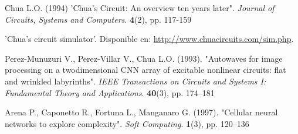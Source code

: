 \documentclass[11pt,letterpaper]{article}
\begin{document}
\begin{multicols*}{2}
\begin{thebibliography}{9}
 Chua L.O. (1994) 'Chua's Circuit: An overview ten years later". \textit{Journal of Circuits, Systems and Computers}. \textbf{4}(2), pp. 117-159 

 'Chua's circuit simulator'. Disponible en: \url{http://www.chuacircuits.com/sim.php}.

 Perez-Munuzuri V., Perez-Villar V., Chua L.O. (1993). "Autowaves for image processing on a twodimensional
CNN array of excitable nonlinear circuits: flat and wrinkled labyrinths".  \textit{IEEE Transactions on Circuits and Systems I: Fundamental Theory and Applications}. \textbf{40}(3), pp. 174–181 

 Arena P., Caponetto R., Fortuna L., Manganaro G. (1997). "Cellular neural networks to explore
complexity". \textit{Soft Computing}. \textbf{1}(3), pp. 120–136 

\end{thebibliography}  
\end{multicols*}
\end{document}

